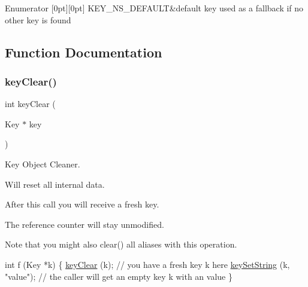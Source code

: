 \begin{DoxyEnumFields}{Enumerator}
[0pt][0pt]{}\mbox{\label{group__key_ggaec3b8d6f430ae49b91bafe8a86310a68ad6792ab14711ed6d6e507ca3d10b05e7}} 
K\+E\+Y\+\_\+\+N\+S\+\_\+\+D\+E\+F\+A\+U\+LT&default key used as a fallback if no other key is found \\
\hline

\end{DoxyEnumFields}


\subsection{Function Documentation}
\mbox{\label{group__key_gab2242311a36bbc0520e0d36895107ec1}} 
\subsubsection{\texorpdfstring{key\+Clear()}{keyClear()}}
{\footnotesize\ttfamily int key\+Clear (\begin{DoxyParamCaption}\item[{Key $\ast$}]{key }\end{DoxyParamCaption})}



Key Object Cleaner. 

Will reset all internal data.

After this call you will receive a fresh key.

The reference counter will stay unmodified.

\begin{DoxyNote}{Note}
that you might also clear() all aliases with this operation.
\end{DoxyNote}

\begin{DoxyCode}
\textcolor{keywordtype}{int} f (Key *k)
\{
        \hyperlink{group__key_gab2242311a36bbc0520e0d36895107ec1}{keyClear} (k);
        \textcolor{comment}{// you have a fresh key k here}
        \hyperlink{group__keyvalue_ga622bde1eb0e0c4994728331326340ef2}{keySetString} (k, \textcolor{stringliteral}{"value"});
        \textcolor{comment}{// the caller will get an empty key k with an value}
\}
\end{DoxyCode}



